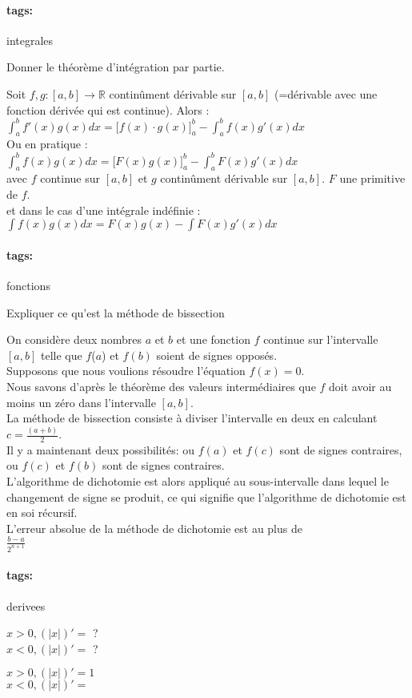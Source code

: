 \documentclass[12pt]{article}
\newcommand*{\xfield}[1]{\begin{mdframed}\centering #1\end{mdframed}\bigskip}
\newenvironment{note}{}{}
\newcommand*{\tags}[1]{\paragraph{tags: }#1}
\begin{document}
\begin{note}
	\tags{integrales}
	\xfield{Donner le théorème d'intégration par partie.}
	\xfield{Soit $f,g : [a,b] \to \mathbb{R}$ continûment dérivable sur $[a,b]$ (=dérivable avec une fonction dérivée qui est continue). Alors :\\
	$\int_a^b f'(x)g(x) dx = \big[f(x)\cdot g(x)\big]_a^b - \int_a^b f(x)g'(x) dx$\\
	Ou en pratique :\\
	$\int_a^b f(x)g(x) dx = \big[ F(x) g(x)\big]_a^b - \int_a^b F(x) g'(x) dx$\\
	avec $f$ continue sur $[a,b]$ et $g$ continûment dérivable sur $[a,b]$. $F$ une primitive de $f$.\\
	et dans le cas d'une intégrale indéfinie :\\
	$\int f(x)g(x) dx = F(x)g(x) - \int F(x)g'(x) dx$ }
\end{note}

\begin{note}
	\tags{fonctions}
	\xfield{Expliquer ce qu'est la méthode de bissection}
	\xfield{On considère deux nombres $a$ et $b$ et une fonction $f$ continue sur l'intervalle $[a, b]$ telle que $f$($a$) et $f(b)$ soient de signes opposés.\\
Supposons que nous voulions résoudre l’équation $f(x) = 0$.\\
Nous savons d'après le théorème des valeurs intermédiaires que $f$ doit avoir au moins un zéro dans l’intervalle $[a, b]$.\\
La méthode de bissection consiste à diviser l’intervalle en deux en calculant $c = \frac{(a+b)}{2}$.\\
Il y a maintenant deux possibilités: ou $f(a)$ et $f(c)$ sont de signes contraires, ou $f(c)$ et $f(b)$ sont de signes contraires.\\
L’algorithme de dichotomie est alors appliqué au sous-intervalle dans lequel le changement de signe se produit, ce qui signifie que l’algorithme de dichotomie est en soi récursif.\\
L’erreur absolue de la méthode de dichotomie est au plus de \\
$\frac{b-a}{2^{n+1}}$}
\end{note}

\begin{note}
	\tags{derivees}
	\xfield{$x>0, (\vert x\vert )' = $ ?\\
			$x<0, (\vert x\vert )' = $ ? }
	\xfield{$x>0, (\vert x\vert )' = 1$\\
			$x<0, (\vert x\vert )' = $}
\end{note}
\end{document}
